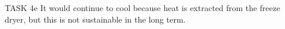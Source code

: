 TASK 4e  
It would continue to cool because heat is extracted from the freeze dryer, but this is not sustainable in the long term.